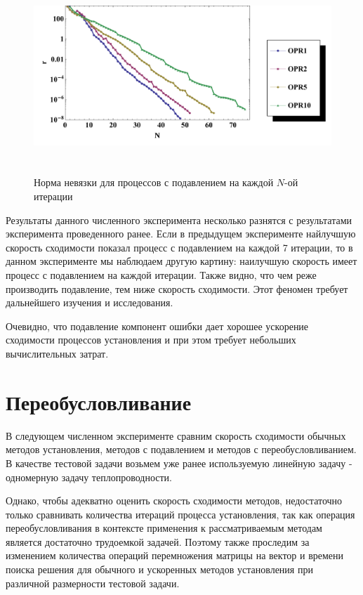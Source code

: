 \documentclass[a4paper,14pt]{extreport}
\begin{document}
	 \begin{figure}[H]
	\begin{center}
	\includegraphics[height=7.3cm]{pics/num_ex_1_1_2.pdf}
	\caption{\small Норма невязки для  процессов с подавлением на каждой $N$-ой итерации}
	\label{num_ex_1_4}
	\end{center}
	\end{figure}

	
Результаты данного численного эксперимента несколько разнятся с результатами эксперимента проведенного ранее. Если в предыдущем эксперименте найлучшую скорость сходимости показал процесс с подавлением на каждой 7 итерации, то в данном эксперименте мы наблюдаем другую картину: наилучшую скорость имеет процесс с подавлением на каждой итерации. Также видно, что чем реже производить подавление, тем ниже скорость сходимости. Этот феномен требует дальнейшего изучения и исследования. 

Очевидно, что подавление компонент ошибки дает хорошее ускорение сходимости процессов установления и при этом требует небольших вычислительных затрат. 
  
  \section{Переобусловливание}
  \label{s:test_precondition}

В следующем численном эксперименте сравним скорость сходимости обычных методов установления, методов с подавлением и методов с переобусловливанием. В качестве тестовой задачи возьмем уже ранее используемую линейную задачу - одномерную задачу теплопроводности.

Однако, чтобы адекватно оценить скорость сходимости методов, недостаточно только сравнивать количества итераций процесса установления, так как операция переобусловливания в контексте применения к рассматриваемым методам является достаточно трудоемкой задачей. Поэтому также проследим за изменением количества операций перемножения матрицы на вектор и времени поиска решения для обычного и ускоренных методов установления при различной размерности тестовой задачи.
\end{document}
